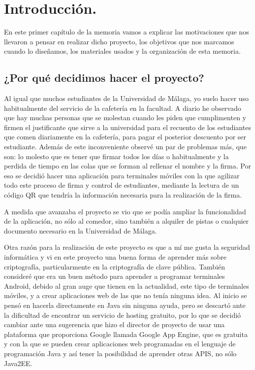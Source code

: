\chapter{Introducción.}\label{ch:introduccion}

En este primer capítulo de la memoria vamos a explicar las motivaciones que nos llevaron a pensar en realizar dicho proyecto, los objetivos que nos marcamos cuando lo diseñamos, los materiales usados y la organización de esta memoria.

\section{¿Por qué decidimos hacer el proyecto?}
Al igual que muchos estudiantes de la Universidad de Málaga, yo suelo hacer uso habitualmente del servicio de la cafetería en la facultad. A diario he observado que hay muchas personas que se molestan cuando les piden que cumplimenten y firmen el justificante que sirve a la universidad para el recuento de los estudiantes que comen diariamente en la cafetería, para pagar el posterior descuento por ser estudiante. Además de este inconveniente observé un par de problemas más, que son: lo molesto que es tener que firmar todos los días o habitualmente y la perdida de tiempo en las colas que se forman al rellenar el nombre y la firma. Por eso se decidió hacer una aplicación para terminales móviles con la que agilizar todo este proceso de firma y control de estudiantes, mediante la lectura de un código QR que tendría la información necesaria para la realización de la firma.

A medida que avanzaba el proyecto se vio que se podía ampliar la funcionalidad de la aplicación, no sólo al comedor, sino también a alquiler de pistas o cualquier documento necesario en la Universidad de Málaga.

Otra razón para la realización de este proyecto es que a mí me gusta la seguridad informática y vi en este proyecto una buena forma de aprender más sobre criptografía, particularmente en la criptografía de clave pública. También consideré que era un buen método para aprender a programar terminales Android, debido al gran auge que tienen en la actualidad, este tipo de terminales móviles, y a crear aplicaciones web de las que no tenía ninguna idea. Al inicio se pensó en hacerla directamente en Java sin ninguna ayuda, pero se descartó ante la dificultad de encontrar un servicio de hosting gratuito, por lo que se decidió cambiar ante una sugerencia que hizo el director de proyecto de usar una plataforma que proporciona Google llamada Google App Engine, que es gratuita y con la que se pueden crear aplicaciones web programadas en el lenguaje de programación Java y así tener la posibilidad de aprender otras APIS, no sólo Java2EE.

